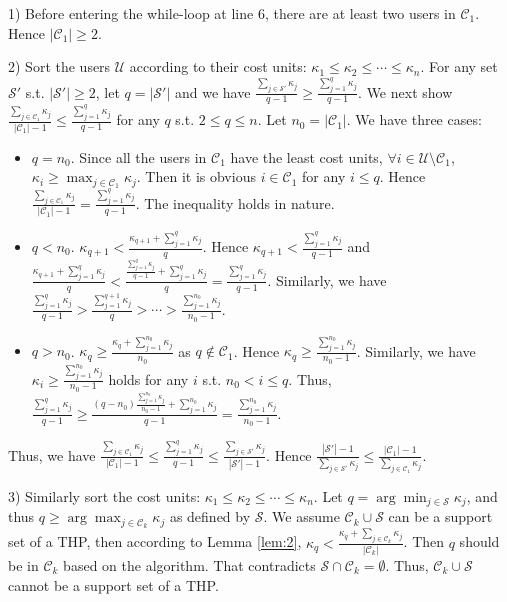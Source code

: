 \documentclass{IEEEtran}
\begin{document}
\begin{IEEEproof}
1) Before entering the while-loop at line 6, there are at least two users in $\mathcal{C}_1$. Hence $|\mathcal{C}_1|\geq 2$.\par{}
2) Sort the users $\mathcal{U}$ according to their cost units: $\kappa_1\leq\kappa_2\leq\cdots\leq\kappa_n$. For any set $\mathcal{S}'$ s.t. $|\mathcal{S}'|\geq 2$, let $q=|\mathcal{S}'|$ and we have $\frac{\sum_{j\in\mathcal{S}'}\kappa_j}{q-1}\geq\frac{\sum_{j=1}^q\kappa_j}{q-1}$. We next show $\frac{\sum_{j\in\mathcal{C}_1}\kappa_j}{|\mathcal{C}_1|-1}\leq\frac{\sum_{j=1}^q\kappa_j}{q-1}$ for any $q$ s.t. $2\leq q\leq n$. Let $n_0=|\mathcal{C}_1|$. We have three cases:
\begin{itemize}
\item $q=n_0$. Since all the users in $\mathcal{C}_1$ have the least cost units, $\forall i\in\mathcal{U}\setminus\mathcal{C}_1$, $\kappa_i\geq\max_{j\in\mathcal{C}_1}\kappa_j$. Then it is obvious $i\in\mathcal{C}_1$ for any $i\leq q$. Hence $\frac{\sum_{j\in\mathcal{C}_1}\kappa_j}{|\mathcal{C}_1|-1}=\frac{\sum_{j=1}^q\kappa_j}{q-1}$. The inequality holds in nature.
\item $q<n_0$. $\kappa_{q+1}<\frac{\kappa_{q+1}+\sum_{j=1}^{q}\kappa_j}{q}$. Hence $\kappa_{q+1}<\frac{\sum_{j=1}^{q}\kappa_j}{q-1}$ and $\frac{\kappa_{q+1}+\sum_{j=1}^q\kappa_j}{q}<\frac{\frac{\sum_{j=1}^{q}\kappa_j}{q-1}+\sum_{j=1}^q\kappa_j}{q}=\frac{\sum_{j=1}^{q}\kappa_j}{q-1}$. Similarly, we have $\frac{\sum_{j=1}^{q}\kappa_j}{q-1}>\frac{\sum_{j=1}^{q+1}\kappa_j}{q}>\cdots>\frac{\sum_{j=1}^{n_0}\kappa_j}{n_0-1}$.
\item $q>n_0$. $\kappa_{q}\geq\frac{\kappa_{q}+\sum_{j=1}^{n_0}\kappa_j}{n_0}$ as $q \notin \mathcal{C}_1$. Hence $\kappa_{q}\geq\frac{\sum_{j=1}^{n_0}\kappa_j}{n_0-1}$. Similarly, we have $\kappa_{i}\geq\frac{\sum_{j=1}^{n_0}\kappa_j}{n_0-1}$ holds for any $i$ s.t. $n_0<i\leq q$. Thus, $\frac{\sum_{j=1}^{q}\kappa_j}{q-1}\geq\frac{(q-n_0)\frac{\sum_{j=1}^{n_0}\kappa_j}{n_0-1}+\sum_{j=1}^{n_0}\kappa_j}{q-1}=\frac{\sum_{j=1}^{n_0}\kappa_j}{n_0-1}$.
\end{itemize}
Thus, we have $\frac{\sum_{j\in\mathcal{C}_1}\kappa_j}{|\mathcal{C}_1|-1}\leq\frac{\sum_{j=1}^{q}\kappa_j}{q-1}\leq\frac{\sum_{j\in\mathcal{S}'}\kappa_j}{|\mathcal{S}'|-1}$. Hence $\frac{|\mathcal{S}'|-1}{\sum_{j\in\mathcal{S}'}\kappa_j}\leq\frac{|\mathcal{C}_1|-1}{\sum_{j\in\mathcal{C}_1}\kappa_j}$.\par{}
3) Similarly sort the cost units: $\kappa_1\leq\kappa_2\leq\cdots\leq\kappa_n$. Let $q=\arg\min_{j\in\mathcal{S}}\kappa_j$, and thus $q\geq \arg\max_{j\in\mathcal{C}_k}\kappa_j$ as defined by $\mathcal{S}$. We assume $\mathcal{C}_k\cup\mathcal{S}$ can be a support set of a THP, then according to Lemma \ref{lem:2}, $\kappa_q < \frac{\kappa_q+\sum_{j\in\mathcal{C}_k}\kappa_j}{|\mathcal{C}_k|}$. Then $q$ should be in $\mathcal{C}_k$ based on the algorithm. That contradicts $\mathcal{S}\cap\mathcal{C}_k=\emptyset$. Thus, $\mathcal{C}_k\cup\mathcal{S}$ cannot be a support set of a THP.
\end{IEEEproof}
\end{document}

